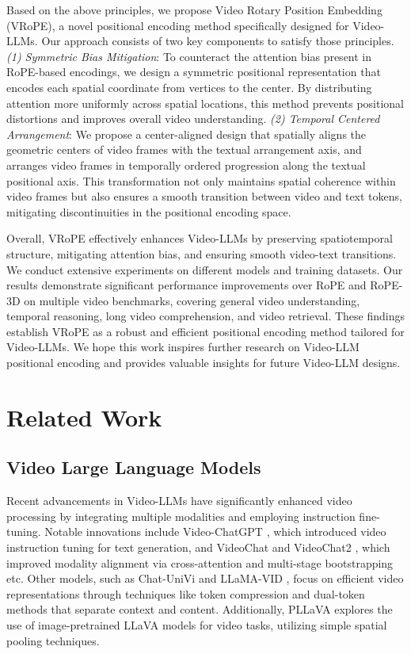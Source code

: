 \documentclass[11pt]{article}
\newcommand{\methodname}{VRoPE\xspace}
\begin{document}
Based on the above principles, we propose Video Rotary Position Embedding (\methodname), a novel positional encoding method specifically designed for Video-LLMs. 
Our approach consists of two key components to satisfy those principles. \textit{(1) Symmetric Bias Mitigation}: To counteract the attention bias present in RoPE-based encodings, we design a symmetric positional representation that encodes each spatial coordinate from vertices to the center. By distributing attention more uniformly across spatial locations, this method prevents positional distortions and improves overall video understanding. \textit{(2) Temporal Centered Arrangement}: We propose a center-aligned design that spatially aligns the geometric centers of video frames with the textual arrangement axis, and arranges video frames in temporally ordered progression along the textual positional axis. This transformation not only maintains spatial coherence within video frames but also ensures a smooth transition between video and text tokens, mitigating discontinuities in the positional encoding space.

Overall, \methodname effectively enhances Video-LLMs by preserving spatiotemporal structure, mitigating attention bias, and ensuring smooth video-text transitions. We conduct extensive experiments on different models and training datasets. Our results demonstrate significant performance improvements over RoPE and RoPE-3D on multiple video benchmarks, covering general video understanding, temporal reasoning, long video comprehension, and video retrieval. These findings establish \methodname as a robust and efficient positional encoding method tailored for Video-LLMs. We hope this work inspires further research on Video-LLM positional encoding and provides valuable insights for future Video-LLM designs.

\section{Related Work}

\subsection{Video Large Language Models}
Recent advancements in Video-LLMs \cite{maaz2023video, li2023videochat, li2024mvbench, jin2024chat, li2024llama, xu2024pllava} have significantly enhanced video processing by integrating multiple modalities and employing instruction fine-tuning. Notable innovations include Video-ChatGPT \cite{maaz2023video}, which introduced video instruction tuning for text generation, and VideoChat \cite{li2023videochat} and VideoChat2 \cite{li2024mvbench}, which improved modality alignment via cross-attention and multi-stage bootstrapping etc. Other models, such as Chat-UniVi \cite{jin2024chat} and LLaMA-VID \cite{li2024llama}, focus on efficient video representations through techniques like token compression and dual-token methods that separate context and content. Additionally, PLLaVA \cite{xu2024pllava} explores the use of image-pretrained LLaVA models for video tasks, utilizing simple spatial pooling techniques.
\end{document}
